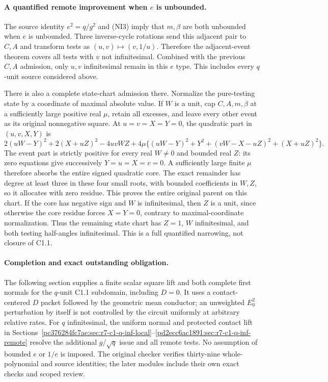 \paragraph{A quantified remote improvement when $e$ is unbounded.}
The source identity $e^2=q/g^2$ and (NI3) imply that $m,\beta$ are
both unbounded when $e$ is unbounded. Three inverse-cycle rotations
send this adjacent pair to $C,A$ and transform tests as
$(u,v)\mapsto(v,1/u)$. Therefore the adjacent-event theorem covers
all tests with $v$ not infinitesimal. Combined with the previous
$C,A$ admission, only $u,v$ infinitesimal remain in this $e$ type.
This includes every $q$-unit source considered above.

There is also a complete state-chart admission there. Normalize the
pure-testing state by a coordinate of maximal absolute value. If
$W$ is a unit, cap $C,A,m,\beta$ at a sufficiently large positive
real $\mu$, retain all excesses, and leave every other event as its
original nonnegative square. At $u=v=X=Y=0$, the quadratic part in
$(u,v,X,Y)$ is
\[
 2(uW-Y)^2+2(X+uZ)^2-4uvWZ+
 4\mu\{(uW-Y)^2+Y^2+(vW-X-uZ)^2+(X+uZ)^2\}.
 \tag{SC8}
\]
The event part is strictly positive for every real $W\ne0$ and bounded
real $Z$: its zero equations give successively $Y=u=X=v=0$. A sufficiently
large finite $\mu$ therefore absorbs the entire signed quadratic core.
The exact remainder has degree at least three in these four small
roots, with bounded coefficients in $W,Z$, so it allocates with zero
residue. This proves the entire original parent on this chart.
If the core has negative sign and $W$ is infinitesimal, then $Z$ is
a unit, since otherwise the core residue forces $X=Y=0$, contrary
to maximal-coordinate normalization. Thus the remaining state chart
has $Z=1$, $W$ infinitesimal, and both testing half-angles infinitesimal.
This is a full quantified narrowing, not closure of C1.1.

\paragraph{Completion and exact outstanding obligation.}
The following section supplies a finite scalar square lift and both
complete first normals for the $q$-unit C1.1 subdomain, including
$D=0$. It uses a contact-centered $D$ packet followed by the geometric
mean conductor; an unweighted $E_0^2$ perturbation by itself is not
controlled by the circuit uniformly at arbitrary relative rates.
For $q$ infinitesimal, the uniform normal and protected contact lift
in Sections~\ref{pc376284fc7ae:sec:r7-c1-q-inf-local}--\ref{pd2ecc6ac1891:sec:r7-c1-q-inf-remote}
resolve the additional $g/\sqrt q$ issue and all remote tests.
No assumption of bounded $e$ or $1/e$ is imposed. The original
checker verifies thirty-nine whole-polynomial and source identities;
the later modules include their own exact checks and scoped review.


